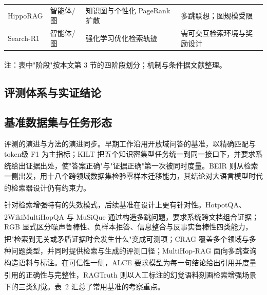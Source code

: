 \documentclass[10.5pt,compsoc,UTF8]{CjC}
\theoremstyle{mystyle}
\newcommand{\upcite}[1]{\textsuperscript{\cite{#1}}}
\begin{document}
\begin{table}[H]
\begin{center}
\begin{tabular}{p{22mm}p{27mm}p{50mm}p{55mm}}
HippoRAG & 智能体/图 & 知识图与个性化 PageRank 扩散 & 多跳联想；图规模受限 \\
Search-R1 & 智能体/图 & 强化学习优化检索轨迹 & 需可交互检索环境与奖励设计 \\
\bottomrule
\end{tabular}
\label{tab1}
\end{center}
\vspace{-1mm}
{\centering 注：表中"阶段"按本文第 3 节的四阶段划分；机制与条件据文献\upcite{lewis2020retrieval,guu2020realm,izacard2020leveraging,borgeaud2021improving,khandelwal2020generalization,gao2022precise,wang2023query,jiang2023llmlingua,xu2024recomp,jiang2023active,trivedi2023interleaving,asai2023self,jeong2024adaptive,izacard2022atlas,shi2023replug,lin2024dit,sarthi2024raptor,edge2024from,guo2024lightrag,gutirrez2024hipporag,jin2025search}整理。}
\end{table}

\begin{multicols}{2}

\section{\heiti 评测体系与实证结论}

\subsection{\heiti 基准数据集与任务形态}

评测的演进与方法的演进同步。早期工作沿用开放域问答的基准，以精确匹配与token级 F1 为主指标；KILT 把五个知识密集型任务统一到同一接口下，并要求系统给出证据出处，使"答案正确"与"证据正确"第一次被同时度量\upcite{petroni2021kilt}。BEIR 则从检索一侧出发，用十八个跨领域数据集检验零样本迁移能力，其结论对大语言模型时代的检索器设计仍有约束力\upcite{thakur2021beir}。

针对检索增强特有的失效模式，后续基准在设计上更有针对性。HotpotQA、2WikiMultiHopQA 与 MuSiQue 通过构造多跳问题，要求系统跨文档组合证据\upcite{yang2018hotpotqa,ho2020constructing,trivedi2022musique}；RGB 显式区分噪声鲁棒性、负样本拒答、信息整合与反事实鲁棒性四类能力，把"检索到无关或矛盾证据时会发生什么"变成可测项\upcite{chen2024benchmarking}；CRAG 覆盖多个领域与多种问题类型，并同时提供检索与生成的评测口径\upcite{yang2024crag}；MultiHop-RAG 面向多跳查询构造语料与标注\upcite{tang2024multihop}。在可信性一侧，ALCE 要求模型为每一句结论给出引用并度量引用的正确性与完整性\upcite{gao2023enabling}，RAGTruth 则以人工标注的幻觉语料刻画检索增强场景下的三类幻觉\upcite{niu2023ragtruth}。表~2 汇总了常用基准的考察重点。

\end{multicols}
\end{document}
